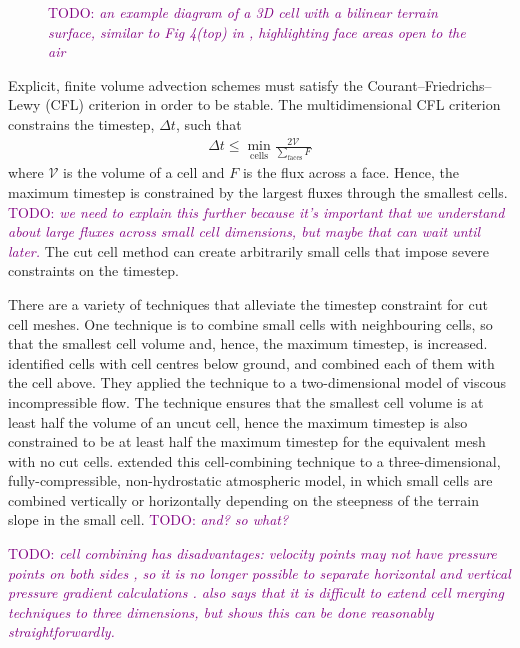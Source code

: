 \documentclass{article}
\newcommand{\TODO}[1]{\textcolor{purple}{TODO: \emph{#1}}}
\begin{document}
\begin{figure}
	\caption{\TODO{an example diagram of a 3D cell with a bilinear terrain surface, similar to Fig 4(top) in \cite{walko-avissar2008b}, highlighting face areas open to the air}}
	\label{fig:cut-cell}
\end{figure}

Explicit, finite volume advection schemes must satisfy the Courant--Friedrichs--Lewy (CFL) criterion in order to be stable.  The multidimensional CFL criterion constrains the timestep, $\Delta t$, such that
\begin{align}
	\Delta t \leq \min_\mathrm{cells} \frac{2\mathcal{V}}{\sum_\mathrm{faces} F}
\end{align}
where $\mathcal{V}$ is the volume of a cell and $F$ is the flux across a face.  Hence, the maximum timestep is constrained by the largest fluxes through the smallest cells.  \TODO{we need to explain this further because it's important that we understand about large fluxes across small cell dimensions, but maybe that can wait until later.}
The cut cell method can create arbitrarily small cells that impose severe constraints on the timestep.

There are a variety of techniques that alleviate the timestep constraint for cut cell meshes.  One technique is to combine small cells with neighbouring cells, so that the smallest cell volume and, hence, the maximum timestep, is increased.  \citet{ye1999} identified cells with cell centres below ground, and combined each of them with the cell above.  They applied the technique to a two-dimensional model of viscous incompressible flow.  The technique ensures that the smallest cell volume is at least half the volume of an uncut cell, hence the maximum timestep is also constrained to be at least half the maximum timestep for the equivalent mesh with no cut cells.
\citet{yamazaki2016} extended this cell-combining technique to a three-dimensional, fully-compressible, non-hydrostatic atmospheric model, in which small cells are combined vertically or horizontally depending on the steepness of the terrain slope in the small cell.  \TODO{and? so what?}

\TODO{cell combining has disadvantages: velocity points may not have pressure points on both sides \citep{kirkpatrick2003}, so it is no longer possible to separate horizontal and vertical pressure gradient calculations \citep{walko-avissar2008b}.  \citet{kirkpatrick2003} also says that it is difficult to extend cell merging techniques to three dimensions, but \citet{yamazaki2016} shows this can be done reasonably straightforwardly.}
\end{document}
